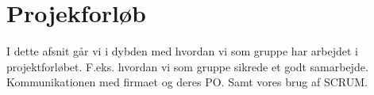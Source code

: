 \section{Projekforløb}
I dette afsnit går vi i dybden med hvordan vi som gruppe har arbejdet i projektforløbet. F.eks. hvordan vi som gruppe sikrede et godt samarbejde. Kommunikationen med firmaet og deres PO. Samt vores brug af SCRUM.


